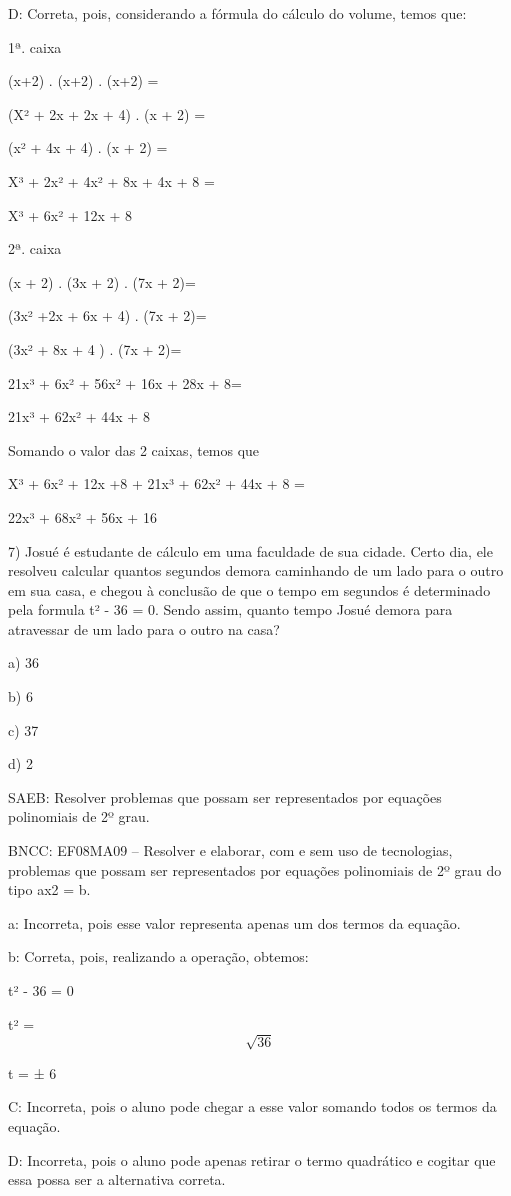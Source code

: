 D: Correta, pois, considerando a fórmula do cálculo do volume, temos
que:

1ª. caixa

(x+2) . (x+2) . (x+2) =

(X² + 2x + 2x + 4) . (x + 2) =

(x² + 4x + 4) . (x + 2) =

X³ + 2x² + 4x² + 8x + 4x + 8 =

X³ + 6x² + 12x + 8

2ª. caixa

(x + 2) . (3x + 2) . (7x + 2)=

(3x² +2x + 6x + 4) . (7x + 2)=

(3x² + 8x + 4 ) . (7x + 2)=

21x³ + 6x² + 56x² + 16x + 28x + 8=

21x³ + 62x² + 44x + 8

Somando o valor das 2 caixas, temos que

X³ + 6x² + 12x +8 + 21x³ + 62x² + 44x + 8 =

22x³ + 68x² + 56x + 16

7) Josué é estudante de cálculo em uma faculdade de sua cidade. Certo
dia, ele resolveu calcular quantos segundos demora caminhando de um lado
para o outro em sua casa, e chegou à conclusão de que o tempo em
segundos é determinado pela formula t² - 36 = 0. Sendo assim, quanto
tempo Josué demora para atravessar de um lado para o outro na casa?

a) 36

b) 6

c) 37

d) 2

SAEB: Resolver problemas que possam ser representados por equações
polinomiais de 2º grau.

BNCC: EF08MA09 -- Resolver e elaborar, com e sem uso de tecnologias,
problemas que possam ser representados por equações polinomiais de 2º
grau do tipo ax2 = b.

a: Incorreta, pois esse valor representa apenas um dos termos da
equação.

b: Correta, pois, realizando a operação, obtemos:

t² - 36 = 0

t² = \[\sqrt{36}\]

t = ± 6

C: Incorreta, pois o aluno pode chegar a esse valor somando todos os
termos da equação.

D: Incorreta, pois o aluno pode apenas retirar o termo quadrático e
cogitar que essa possa ser a alternativa correta.

